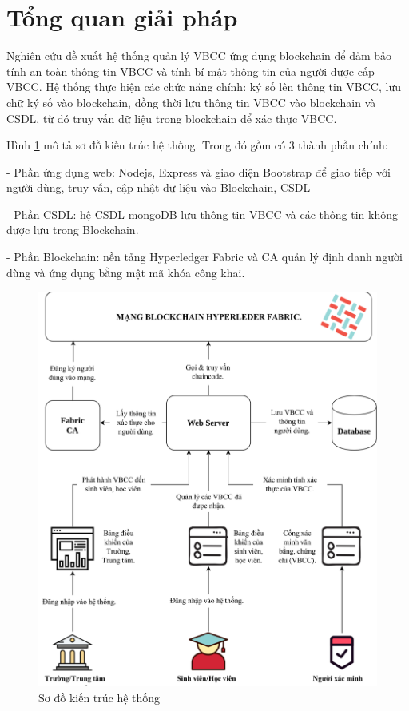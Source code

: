 \section{Tổng quan giải pháp}

Nghiên cứu đề xuất hệ thống quản lý VBCC ứng dụng blockchain để đảm bảo tính an toàn thông tin VBCC và tính bí mật thông tin của người được cấp VBCC.
Hệ thống thực hiện các chức năng chính: ký số lên thông tin VBCC, lưu chữ ký số vào blockchain, đồng thời lưu thông tin VBCC vào blockchain và CSDL, từ đó truy vấn dữ liệu trong blockchain để xác thực VBCC. 

Hình \ref{fig:vbcc_phanmem} mô tả sơ đồ kiến trúc hệ thống. Trong đó gồm có 3 thành phần chính:

- Phần ứng dụng web: Nodejs, Express và giao diện Bootstrap để giao tiếp với người dùng, truy vấn, cập nhật dữ liệu vào Blockchain, CSDL

- Phần CSDL: hệ CSDL mongoDB lưu thông tin VBCC và các thông tin không được lưu trong Blockchain.

- Phần Blockchain: nền tảng Hyperledger Fabric và CA quản lý định danh người dùng và ứng dụng bằng mật mã khóa công khai.

\begin{figure}[H]
\centering
\includegraphics[width=.9\linewidth]{img/vbcc_phanmem.jpg}
\caption{Sơ đồ kiến trúc hệ thống}
\label{fig:vbcc_phanmem}
\end{figure}

